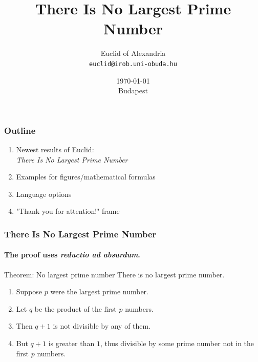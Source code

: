 \documentclass{beamer}
\title[No Largest Prime Number]{There Is No Largest Prime Number} %
\date{\today \\ Budapest} %
\author[Euclid]{Euclid of Alexandria \\ \texttt{euclid@irob.uni-obuda.hu}  } %
\begin{document}
	
	\begin{frame}
		\titlepage
	\end{frame}
	
	\begin{frame}
		\frametitle{Outline}
		
		\begin{enumerate}
			\item Newest results of Euclid: \\	\textit{There Is No Largest Prime Number}
				
				\vspace{3mm}
				
			\item Examples for figures/mathematical formulas
			
				\vspace{3mm}
				
			\item Language options
			
				\vspace{3mm}
			
			\item "Thank you for attention!" frame
		\end{enumerate}
	\end{frame}
	
	\begin{frame} 
		\frametitle{There Is No Largest Prime Number} 
		\framesubtitle{The proof uses \textit{reductio ad absurdum}.} 
		\begin{block}{Theorem: No largest prime number}
			There is no largest prime number. 
		\end{block} 
		\begin{enumerate} 
			\item<1-| alert@1> Suppose $p$ were the largest prime number. 
			\item<2-> Let $q$ be the product of the first $p$ numbers. 
			\item<3-> Then $q+1$ is not divisible by any of them. 
			\item<4-> But $q + 1$ is greater than $1$, thus divisible by some prime
			number not in the first $p$ numbers.
		\end{enumerate}
	\end{frame}
	
\end{document}
